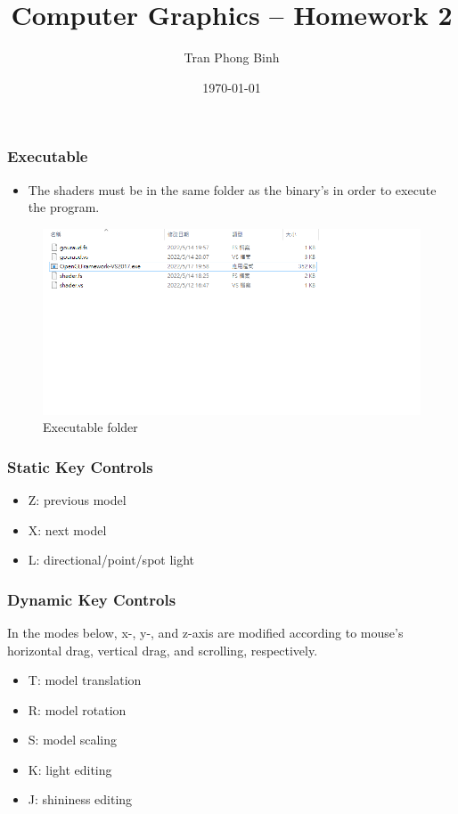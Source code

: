 \documentclass{beamer}
\title{Computer Graphics -- Homework 2}
\author{Tran Phong Binh}
\institute{Student ID: 110062421}
\date{\today}
\begin{document}
\begin{frame}
  \titlepage
\end{frame}

\begin{frame}
  \frametitle{Executable}
  \begin{itemize}
    \item The shaders must be in the same folder as the binary's in order to execute the program.
  \end{itemize}
  \begin{figure}
    \includegraphics[width=\textwidth]{executable}
    \caption{Executable folder}
  \end{figure} 
\end{frame}

\begin{frame}
  \frametitle{Static Key Controls}
  \begin{itemize}
    \item Z: previous model
    \item X: next model
    \item L: directional/point/spot light
  \end{itemize}
\end{frame}

\begin{frame}
  \frametitle{Dynamic Key Controls}
  In the modes below, x-, y-, and z-axis are modified according to mouse's horizontal drag, vertical drag, and scrolling, respectively.
  \begin{itemize}
    \item T: model translation
    \item R: model rotation
    \item S: model scaling
    \item K: light editing
    \item J: shininess editing
  \end{itemize}
\end{frame}
\end{document}
